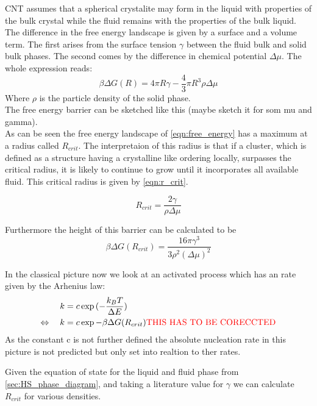 CNT assumes that a spherical crystalite may form in the liquid with properties of the bulk crystal while the fluid remains with the properties of the bulk liquid. The difference in the free energy landscape is given by a surface and a volume term. The first arises from the surface tension $\gamma$ between the fluid bulk and solid bulk phases. The second comes by the difference in chemical potential $\Delta \mu$. The whole expression reads:
\begin{equation}
\label{eqn:free_energy}
\beta \Delta G(R) =4 \pi R \gamma -\frac{4}{3} \pi R^3 \rho \Delta \mu  
\end{equation}
Where $\rho$ is the particle density of the solid phase.\\

The free energy barrier can be sketched like this (maybe sketch it for som mu and gamma).\\

As can be seen the free energy landscape of \autoref{eqn:free_energy} has a maximum at a radius called $R_{crit}$. The interpretaion of this radius is that if a cluster, which is defined as a structure having a crystalline like ordering locally, surpasses the critical radius, it is likely to continue to grow until it incorporates all available fluid. This critical radius is given by \autoref{eqn:r_crit}.

\begin{equation}
\label{eqn:r_crit}
R_{crit} = \frac{2 \gamma}{\rho \Delta \mu }
\end{equation}

Furthermore the height of this barrier can be calculated to be 
\begin{equation}
\beta \Delta G (R_{crit}) = \frac{16 \pi \gamma^3}{3 \rho^2 (\Delta \mu )^2}
\end{equation}

In the classical picture now we look at an activated process which has an rate given by the Arhenius law:
\begin{align}
k&=c \exp{(-\frac{k_B T}{\Delta E})}\\
\Leftrightarrow \quad k &=c \exp{-\beta \Delta G (R_{crit})}
\text{\textcolor{red}{THIS HAS TO BE CORECCTED}}
\end{align}
As the constant c is not further defined the absolute nucleation rate in this picture is not predicted but only set into realtion to ther rates. 

Given the equation of state for the liquid and fluid phase from \autoref{sec:HS_phase_diagram}, and taking a literature value for $\gamma$  we can calculate $R_{crit}$ for various densities.

